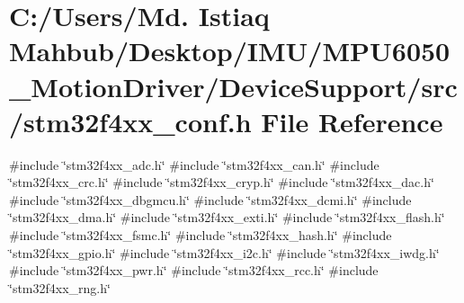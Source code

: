 \section{C\+:/\+Users/\+Md. Istiaq Mahbub/\+Desktop/\+I\+M\+U/\+M\+P\+U6050\+\_\+\+Motion\+Driver/\+Device\+Support/src/stm32f4xx\+\_\+conf.h File Reference}
\label{stm32f4xx__conf_8h}
{\ttfamily \#include \char`\"{}stm32f4xx\+\_\+adc.\+h\char`\"{}}\newline
{\ttfamily \#include \char`\"{}stm32f4xx\+\_\+can.\+h\char`\"{}}\newline
{\ttfamily \#include \char`\"{}stm32f4xx\+\_\+crc.\+h\char`\"{}}\newline
{\ttfamily \#include \char`\"{}stm32f4xx\+\_\+cryp.\+h\char`\"{}}\newline
{\ttfamily \#include \char`\"{}stm32f4xx\+\_\+dac.\+h\char`\"{}}\newline
{\ttfamily \#include \char`\"{}stm32f4xx\+\_\+dbgmcu.\+h\char`\"{}}\newline
{\ttfamily \#include \char`\"{}stm32f4xx\+\_\+dcmi.\+h\char`\"{}}\newline
{\ttfamily \#include \char`\"{}stm32f4xx\+\_\+dma.\+h\char`\"{}}\newline
{\ttfamily \#include \char`\"{}stm32f4xx\+\_\+exti.\+h\char`\"{}}\newline
{\ttfamily \#include \char`\"{}stm32f4xx\+\_\+flash.\+h\char`\"{}}\newline
{\ttfamily \#include \char`\"{}stm32f4xx\+\_\+fsmc.\+h\char`\"{}}\newline
{\ttfamily \#include \char`\"{}stm32f4xx\+\_\+hash.\+h\char`\"{}}\newline
{\ttfamily \#include \char`\"{}stm32f4xx\+\_\+gpio.\+h\char`\"{}}\newline
{\ttfamily \#include \char`\"{}stm32f4xx\+\_\+i2c.\+h\char`\"{}}\newline
{\ttfamily \#include \char`\"{}stm32f4xx\+\_\+iwdg.\+h\char`\"{}}\newline
{\ttfamily \#include \char`\"{}stm32f4xx\+\_\+pwr.\+h\char`\"{}}\newline
{\ttfamily \#include \char`\"{}stm32f4xx\+\_\+rcc.\+h\char`\"{}}\newline
{\ttfamily \#include \char`\"{}stm32f4xx\+\_\+rng.\+h\char`\"{}}\newline
